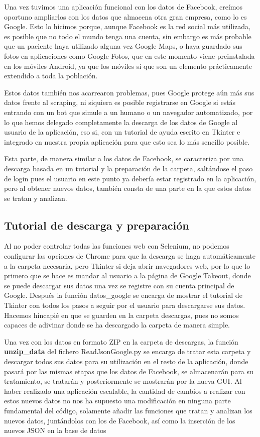 Una vez tuvimos una aplicación funcional con los datos de Facebook, creímos oportuno ampliarlos con los datos que almacena otra gran empresa, como lo es Google. Esto lo hicimos porque, aunque Facebook es la red social más utilizada, es posible que no todo el mundo tenga una cuenta, sin embargo es más probable que un paciente haya utilizado alguna vez Google Maps, o haya guardado sus fotos en aplicaciones como Google Fotos, que en este momento viene preinstalada en los móviles Android, ya que los móviles sí que son un elemento prácticamente extendido a toda la población.

Estos datos también nos acarrearon problemas, pues Google protege aún más sus datos frente al scraping, ni siquiera es posible registrarse en Google si estás entrando con un bot que simule a un humano o un navegador automatizado, por lo que hemos delegado completamente la descarga de los datos de Google al usuario de la aplicación, eso si, con un tutorial de ayuda escrito en Tkinter e integrado en nuestra propia aplicación para que esto sea lo más sencillo posible.

Esta parte, de manera similar a los datos de Facebook, se caracteriza por una descarga basada en un tutorial y la preparación de la carpeta, saltándose el paso de login pues el usuario en este punto ya debería estar registrado en la aplicación, pero al obtener nuevos datos, también consta de una parte en la que estos datos se tratan y analizan.

\subsection{Tutorial de descarga y preparación}

Al no poder controlar todas las funciones web con Selenium, no podemos configurar las opciones de Chrome para que la descarga se haga automáticamente a la carpeta necesaria, pero Tkinter si deja abrir navegadores web, por lo que lo primero que se hace es mandar al usuario a la página de Google Takeout, donde se puede descargar sus datos una vez se registre con su cuenta principal de Google. Después la función datos\_google se encarga de mostrar el tutorial de Tkinter con todos los pasos a seguir por el usuario para descargarse sus datos. Hacemos hincapié en que se guarden en la carpeta descargas, pues no somos capaces de adivinar donde se ha descargado la carpeta de manera simple.

Una vez con los datos en formato ZIP en la carpeta de descargas, la función \textbf{unzip\_data} del fichero ReadJsonGoogle.py se encarga de tratar esta carpeta y descargar todos sus datos para su utilización en el resto de la aplicación, donde pasará por las mismas etapas que los datos de Facebook, se almacenarán para su tratamiento, se tratarán y posteriormente se mostrarán por la nueva GUI. Al haber realizado una aplicación escalable, la cantidad de cambios a realizar con estos nuevos datos no nos ha supuesto una modificación en ninguna parte fundamental del código, solamente añadir las funciones que tratan y analizan los nuevos datos, juntándolos con los de Facebook, así como la inserción de los nuevos JSON en la base de datos

